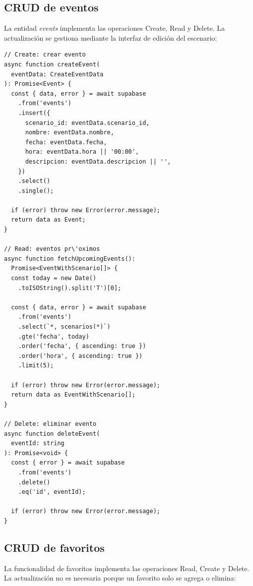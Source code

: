 \subsection{CRUD de eventos}

La entidad \textit{events} implementa las operaciones Create, Read
y Delete. La actualizaci\'on se gestiona mediante la interfaz de
edici\'on del escenario:

\begin{lstlisting}
// Create: crear evento
async function createEvent(
  eventData: CreateEventData
): Promise<Event> {
  const { data, error } = await supabase
    .from('events')
    .insert({
      scenario_id: eventData.scenario_id,
      nombre: eventData.nombre,
      fecha: eventData.fecha,
      hora: eventData.hora || '00:00',
      descripcion: eventData.descripcion || '',
    })
    .select()
    .single();

  if (error) throw new Error(error.message);
  return data as Event;
}

// Read: eventos pr\'oximos
async function fetchUpcomingEvents():
  Promise<EventWithScenario[]> {
  const today = new Date()
    .toISOString().split('T')[0];

  const { data, error } = await supabase
    .from('events')
    .select(`*, scenarios(*)`)
    .gte('fecha', today)
    .order('fecha', { ascending: true })
    .order('hora', { ascending: true })
    .limit(5);

  if (error) throw new Error(error.message);
  return data as EventWithScenario[];
}

// Delete: eliminar evento
async function deleteEvent(
  eventId: string
): Promise<void> {
  const { error } = await supabase
    .from('events')
    .delete()
    .eq('id', eventId);

  if (error) throw new Error(error.message);
}
\end{lstlisting}

\subsection{CRUD de favoritos}

La funcionalidad de favoritos implementa las operaciones Read,
Create y Delete. La actualizaci\'on no es necesaria porque un
favorito solo se agrega o elimina:

